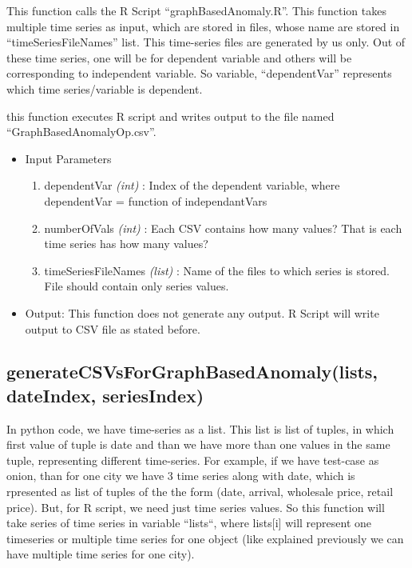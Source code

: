 This function calls the R Script ``graphBasedAnomaly.R''. This function takes 
multiple time series as input, which are stored in files, whose name are stored 
in ``timeSeriesFileNames'' list. This time-series files are generated by us 
only. Out of these time series, one will be for dependent variable and others 
will be corresponding to independent variable. So variable, ``dependentVar'' 
represents which time series/variable is dependent.

this function executes R script and writes output to the file named 
``GraphBasedAnomalyOp.csv''.

\begin{itemize}
 \item Input Parameters
 
 \begin{enumerate}
  \item dependentVar \textit{(int)} : Index of the dependent variable, where 
dependentVar = function of independantVars
  \item numberOfVals \textit{(int)} : Each CSV contains how many values? That 
is each time series has how many values?
  \item timeSeriesFileNames \textit{(list)} : Name of the files to which series 
is stored. File should contain only series values.

 \end{enumerate}

 \item Output: This function does not generate any output. R Script will write 
output to CSV file as stated before.

 
\end{itemize}


\subsection{generateCSVsForGraphBasedAnomaly(lists, dateIndex, seriesIndex)}

In python code, we have time-series as a list. This list is list of tuples, in 
which first value of tuple is date and than we have more than one values in the 
same tuple, representing different time-series. For example, if we have 
test-case as onion, than for one city we have 3 time series along with date, 
which is rpresented as list of tuples of the the form (date, arrival, wholesale 
price, retail price). But, for R script, we need just time series values. So 
this function will take series of time series in variable ``lists``, where 
lists[i] will represent one timeseries or multiple time series for one object 
(like explained previously we can have multiple time series for one city).

